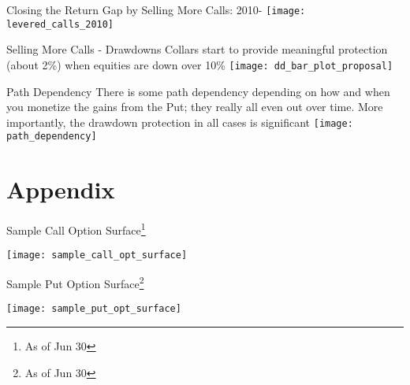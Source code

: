 \documentclass{beamer}
\begin{document}
\begin{frame}{Closing the Return Gap by Selling More Calls: 2010-}
\texttt{[image: levered\_calls\_2010]}
\end{frame}

\begin{frame}{Selling More Calls - Drawdowns}
Collars start to provide meaningful protection (about 2\%) when equities are down over 10\%
\texttt{[image: dd\_bar\_plot\_proposal]}
\end{frame}

\begin{frame}{Path Dependency}
\small
There is some path dependency depending on how and when you monetize the gains from the Put; they really all even out over time. More importantly, the drawdown protection in all cases is significant
\texttt{[image: path\_dependency]}
\end{frame}



\section{Appendix}


\begin{frame}{Sample Call Option Surface\footnote{As of Jun 30}}

\texttt{[image: sample\_call\_opt\_surface]}

\end{frame}

\begin{frame}{Sample Put Option Surface\footnote{As of Jun 30}}

\texttt{[image: sample\_put\_opt\_surface]}

\end{frame}
\end{document}
